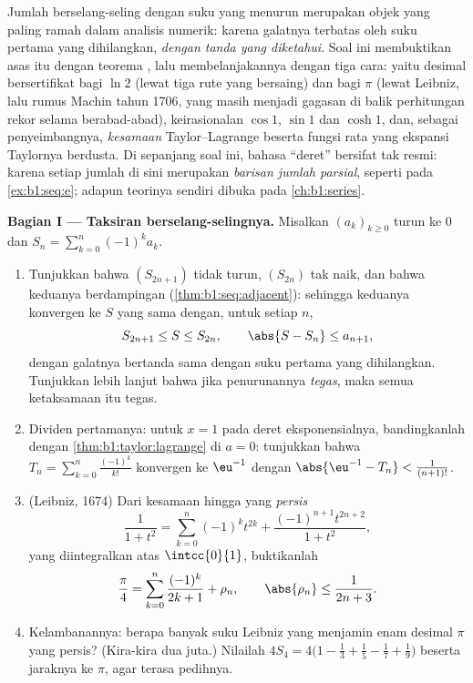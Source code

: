 \begin{problem}
\label{pb:b1:taylor:1}
Jumlah berselang-seling dengan suku yang menurun merupakan objek yang paling ramah
dalam analisis numerik: karena galatnya terbatas oleh suku pertama
yang dihilangkan, \emph{dengan tanda yang diketahui}. Soal ini membuktikan asas itu
dengan teorema , lalu membelanjakannya
dengan tiga cara: yaitu desimal bersertifikat bagi $\ln 2$ (lewat tiga rute
yang bersaing) dan bagi $\pi$ (lewat Leibniz, lalu rumus Machin tahun 1706, yang masih
menjadi gagasan di balik perhitungan rekor selama berabad-abad),
keirasionalan $\cos 1$, $\sin 1$ dan $\cosh 1$, dan, sebagai
penyeimbangnya, \emph{kesamaan} Taylor--Lagrange beserta fungsi
rata yang ekspansi Taylornya berdusta.
Di sepanjang soal ini, bahasa ``deret'' bersifat tak resmi: karena setiap jumlah
di sini merupakan \emph{barisan jumlah parsial}, seperti pada
\cref{ex:b1:seq:e}; adapun teorinya sendiri dibuka pada
\cref{ch:b1:series}.

\medskip
\noindent\textbf{Bagian I --- Taksiran berselang-selingnya.} Misalkan
$(a_k)_{k \geq 0}$ turun ke $0$ dan $S_n = \sum_{k=0}^{n}
(-1)^k a_k$.
\begin{enumerate}
  \item Tunjukkan bahwa $(S_{2n+1})$ tidak turun, $(S_{2n})$
        tak naik, dan bahwa keduanya berdampingan
        (\cref{thm:b1:seq:adjacent}): sehingga keduanya konvergen ke $S$
        yang sama dengan, untuk setiap $n$,
        \[
        S_{2n+1} \leq S \leq S_{2n},
        \qquad
        \abs{S - S_n} \leq a_{n+1} ,
        \]
        dengan galatnya bertanda sama dengan suku pertama yang dihilangkan.
        Tunjukkan lebih lanjut bahwa jika penurunannya \emph{tegas}, maka semua
        ketaksamaan itu tegas.
  \item Dividen pertamanya: untuk $x = 1$ pada deret eksponensialnya,
        bandingkanlah dengan \cref{thm:b1:taylor:lagrange} di $a = 0$:
        tunjukkan bahwa $T_n = \sum_{k=0}^{n} \frac{(-1)^k}{k!}$
        konvergen ke $\eu^{-1}$ dengan $\abs{\eu^{-1} - T_n} <
        \frac{1}{(n+1)!}$.
  \item (Leibniz, 1674) Dari kesamaan hingga yang \emph{persis}
        \[
        \frac{1}{1 + t^2} = \sum_{k=0}^{n} (-1)^k t^{2k}
        + \frac{(-1)^{n+1} t^{2n+2}}{1 + t^2} ,
        \]
        yang diintegralkan atas $\intcc{0}{1}$, buktikanlah
        \[
        \frac\pi4 = \sum_{k=0}^{n} \frac{(-1)^k}{2k+1} + \rho_n,
        \qquad \abs{\rho_n} \leq \frac{1}{2n+3} .
        \]
  \item Kelambanannya: berapa banyak suku Leibniz yang menjamin enam desimal $\pi$
        yang persis? (Kira-kira dua juta.) Nilailah $4 S_4
        = 4\bigl(1 - \frac13 + \frac15 - \frac17 +
        \frac19\bigr)$ beserta jaraknya ke $\pi$, agar terasa
        pedihnya.
\end{enumerate}


\end{problem}
